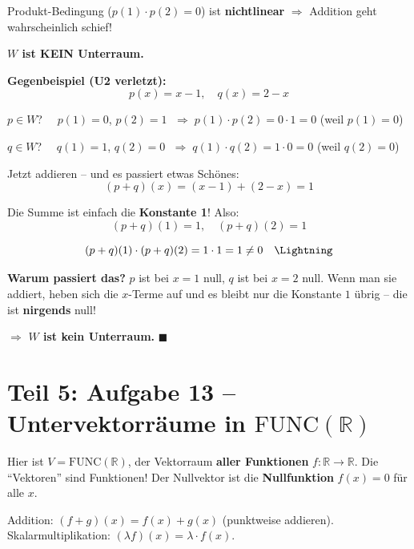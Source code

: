 \documentclass[a4paper,12pt]{article}
\begin{document}
\begin{merkbox}
Produkt-Bedingung ($p(1) \cdot p(2) = 0$) ist \textbf{nichtlinear} $\Rightarrow$ Addition geht wahrscheinlich schief!
\end{merkbox}

\textbf{$W$ ist KEIN Unterraum.}

\textbf{Gegenbeispiel (U2 verletzt):}
\[
p(x) = x - 1, \quad q(x) = 2 - x
\]

$p \in W$? $\quad p(1) = 0$, $p(2) = 1$ $\;\Rightarrow\; p(1) \cdot p(2) = 0 \cdot 1 = 0$ \checkmark{} \quad (weil $p(1) = 0$)

$q \in W$? $\quad q(1) = 1$, $q(2) = 0$ $\;\Rightarrow\; q(1) \cdot q(2) = 1 \cdot 0 = 0$ \checkmark{} \quad (weil $q(2) = 0$)

Jetzt addieren -- und es passiert etwas Sch\"ones:
\[
(p + q)(x) = (x - 1) + (2 - x) = 1
\]

Die Summe ist einfach die \textbf{Konstante 1}! Also:
\[
(p+q)(1) = 1, \quad (p+q)(2) = 1
\]

\[
(p+q)(1) \cdot (p+q)(2) = 1 \cdot 1 = 1 \neq 0 \quad \Lightning
\]

\textbf{Warum passiert das?} $p$ ist bei $x=1$ null, $q$ ist bei $x=2$ null. Wenn man sie addiert, heben sich die $x$-Terme auf und es bleibt nur die Konstante $1$ \"ubrig -- die ist \textbf{nirgends} null!

$\Rightarrow$ \textbf{$W$ ist kein Unterraum.} \hfill $\blacksquare$

\newpage

\part*{Teil 5: Aufgabe 13 -- Untervektorr\"aume in $\mathrm{FUNC}(\mathbb{R})$}

Hier ist $V = \mathrm{FUNC}(\mathbb{R})$, der Vektorraum \textbf{aller Funktionen} $f \colon \mathbb{R} \to \mathbb{R}$. Die ``Vektoren'' sind Funktionen! Der Nullvektor ist die \textbf{Nullfunktion} $f(x) = 0$ f\"ur alle $x$.

Addition: $(f + g)(x) = f(x) + g(x)$ (punktweise addieren).\\
Skalarmultiplikation: $(\lambda f)(x) = \lambda \cdot f(x)$.

\end{document}
